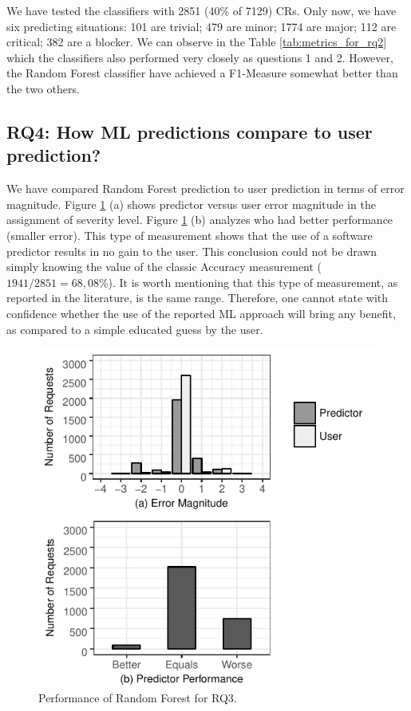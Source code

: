 \documentclass[10pt, conference]{IEEEtran}
\begin{document}
We have tested the classifiers with 2851 (40\% of 7129) CRs. Only now, we have six predicting situations: 101 are trivial; 479 are minor; 1774 are major; 112 are critical; 382 are a blocker. We can observe in the Table \ref{tab:metrics_for_rq2} which the classifiers also performed very closely as questions 1 and 2. However, the Random Forest classifier have achieved a F1-Measure somewhat better than the two others. 

\subsection{RQ4: How ML predictions compare to user prediction?}

We have compared Random Forest prediction to user prediction in terms of error magnitude. Figure \ref{fig:rf_performance_for_q3} (a) shows predictor versus user error magnitude in the assignment of severity level.  Figure \ref{fig:rf_performance_for_q3} (b) analyzes who had better performance (smaller error). This type of measurement shows that the use of a software predictor results in no gain to the user. This conclusion could not be drawn simply knowing the value of the classic Accuracy measurement  ($ 1941 / 2851 = 68,08\% $). It is worth mentioning that this type of measurement, as reported in the literature, is the same range. Therefore, one cannot state with confidence whether the use of the reported ML approach will bring any  benefit, as compared to a simple educated guess by the user.



\begin{figure}[!ht]

  \includegraphics[scale=0.90]{figures/rf_performance_for_q3.pdf}
  \caption{Performance of Random Forest for RQ3.}
    \label{fig:rf_performance_for_q3}
\end{figure}
\end{document}
